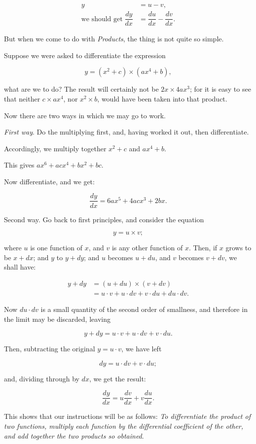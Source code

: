 \documentclass{ximera}
\begin{document}
\begin{align*}
y &=u-v,\\ 
\text{we should get}\; \dfrac{dy}{dx} &=\dfrac{du}{dx}−\dfrac{dv}{dx}.
\end{align*}

But when we come to do with \emph{Products}, the thing is not quite so simple.

Suppose we were asked to differentiate the expression

$$
y=(x^2+c)\times (ax^4+b),
$$

what are we to do? The result will certainly not be $2x\times 4ax^3$; for it is easy to see that neither 
$c \times ax^4$, nor $x^2\times b$, would have been taken into that product.

Now there are two ways in which we may go to work.

\emph{First way}. Do the multiplying first, and, having worked it out, then differentiate.

Accordingly, we multiply together $x^2+c$ and $ax^4+b$.

This gives $ax^6+acx^4+bx^2+bc$.


Now differentiate, and we get:

$$
\dfrac{dy}{dx}=6ax^5+4acx^3+2bx.
$$

Second way. Go back to first principles, and consider the equation

$$
y=u\times v;
$$

where $u$ is one function of $x$, and $v$ is any other function of $x$. Then, if $x$ grows to be $x+dx$; and $y$ 
to $y+dy$; and $u$ becomes $u+du$, and $v$ becomes $v+dv$, we shall have:

\begin{align*}
y+dy &=(u+du)\times (v+dv)\\
   &=u\cdot v+u\cdot dv+v\cdot du+du\cdot dv.
\end{align*}

Now $du\cdot dv$
is a small quantity of the second order of smallness, and therefore in the limit may be discarded, leaving

$$
y+dy=u\cdot v+u\cdot dv+v\cdot du.
$$

Then, subtracting the original $y=u\cdot v$, we have left

$$
dy=u\cdot dv+v\cdot du;
$$

and, dividing through by $dx$, we get the result:

$$
\dfrac{dy}{dx}=u\dfrac{dv}{dx}+v\dfrac{du}{dx}.
$$

This shows that our instructions will be as follows: \emph{To differentiate the product of two functions, 
multiply each function by the differential coefficient of the other, and add together the two products so obtained}.
\end{document}
